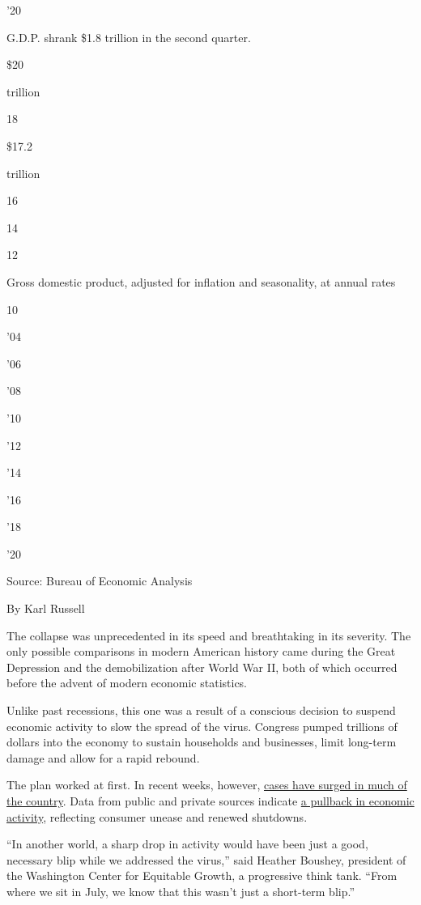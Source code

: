 '20

G.D.P. shrank \$1.8 trillion in the second quarter.

\$20

trillion

18

\$17.2

trillion

16

14

12

Gross domestic product, adjusted for inflation and seasonality, at
annual rates

10

'04

'06

'08

'10

'12

'14

'16

'18

'20

Source: Bureau of Economic Analysis

By Karl Russell

The collapse was unprecedented in its speed and breathtaking in its
severity. The only possible comparisons in modern American history came
during the Great Depression and the demobilization after World War II,
both of which occurred before the advent of modern economic statistics.

Unlike past recessions, this one was a result of a conscious decision to
suspend economic activity to slow the spread of the virus. Congress
pumped trillions of dollars into the economy to sustain households and
businesses, limit long-term damage and allow for a rapid rebound.

The plan worked at first. In recent weeks, however,
\href{https://www.nytimes3xbfgragh.onion/2020/07/29/health/coronavirus-future-america.html}{cases
have surged in much of the country}. Data from public and private
sources indicate
\href{https://www.nytimes3xbfgragh.onion/2020/07/15/business/economy/economic-recovery-coronavirus-resurgence.html?action=click\&module=RelatedLinks\&pgtype=Article}{a
pullback in economic activity}, reflecting consumer unease and renewed
shutdowns.

``In another world, a sharp drop in activity would have been just a
good, necessary blip while we addressed the virus,'' said Heather
Boushey, president of the Washington Center for Equitable Growth, a
progressive think tank. ``From where we sit in July, we know that this
wasn't just a short-term blip.''

